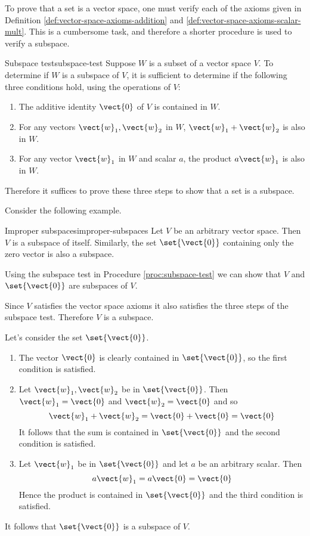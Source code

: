 To prove that a set is a vector space, one must verify each of the axioms given in Definition \ref{def:vector-space-axioms-addition} and \ref{def:vector-space-axioms-scalar-mult}. This is a cumbersome task, and therefore a shorter procedure is used to verify a subspace. 

\begin{procedure}{Subspace test}{subspace-test}
Suppose $W$ is a subset of a vector space $V$. To determine if $W$ is a subspace of $V$, it is sufficient to determine if the following three conditions hold, using the operations of $V$: 
\begin{enumerate}
\item
The additive identity $\vect{0}$ of $V$ is contained in $W$.
\item
For any vectors $\vect{w}_1, \vect{w}_2$ in $W$, $\vect{w}_1 + \vect{w}_2$ is also in $W$.
\item
For any vector $\vect{w}_1$ in $W$ and scalar $a$,  the product $a\vect{w}_1$ is also in $W$. 
\end{enumerate}
\end{procedure}

Therefore it suffices to prove these three steps to show that a set is a subspace. 

Consider the following example.

\begin{example}{Improper subspaces}{improper-subspaces}
Let $V$ be an arbitrary vector space. Then $V$ is a subspace of itself. Similarly, the set $\set{\vect{0} }$ containing only the zero vector is also a subspace. 
\end{example}

\begin{solution}
Using the subspace test in Procedure \ref{proc:subspace-test} we can show that $V$ and $\set{\vect{0} }$ are subspaces of $V$. 

Since $V$ satisfies the vector space axioms it also satisfies the three steps of the subspace test. Therefore $V$ is a subspace.

Let's consider the set $\set{\vect{0} }$. 
\begin{enumerate}
\item
The vector $\vect{0}$ is clearly contained in  $\set{\vect{0} }$, so the first condition is satisfied.

\item
Let $\vect{w}_1, \vect{w}_2$ be in  $\set{\vect{0} }$. Then $\vect{w}_1 = \vect{0}$ and $\vect{w}_2 = \vect{0}$ and so 
\[
\vect{w}_1 + \vect{w}_2 = \vect{0} + \vect{0} = \vect{0}
\]
It follows that the sum is contained in $\set{\vect{0} }$ and the second condition is satisfied. 

\item
Let $\vect{w}_1$ be in  $\set{\vect{0} }$ and let $a$ be an arbitrary scalar. Then
\[
a\vect{w}_1  = a\vect{0} = \vect{0}
\]
Hence the product is contained in  $\set{\vect{0} }$ and the third condition is satisfied. 
\end{enumerate}

It follows that  $\set{\vect{0} }$ is a subspace of $V$. 
\end{solution}

